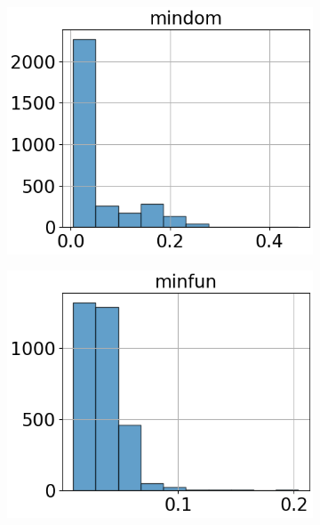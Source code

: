 \begin{figure}[htbp]
\begin{subfigure}[t]{.24\textwidth}
        \includegraphics[width=\linewidth]{../../python_code/plots/logistic_regression/histogram-mindom.png}
    \end{subfigure}
    \begin{subfigure}[t]{.24\textwidth}
        \centering 
        \includegraphics[width=\linewidth]{../../python_code/plots/logistic_regression/histogram-minfun.png}
    \end{subfigure}
    \begin{subfigure}[t]{.24\textwidth}
        \centering 

\end{subfigure}
\end{figure}
